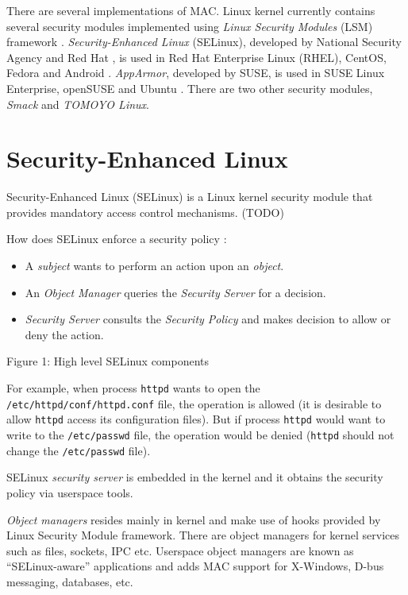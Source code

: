 There are several implementations of MAC. Linux kernel currently contains
several security modules implemented using \emph{Linux Security Modules} (LSM)
framework \cite{lsmusage}. \emph{Security-Enhanced Linux} (SELinux), developed
by National Security Agency and Red Hat \cite{selinuxcontr}, is used in Red Hat
Enterprise Linux (RHEL), CentOS, Fedora and Android
\cite{selinuxguide,selinuxguidefedora,selinuxandroid}. \emph{AppArmor},
developed by SUSE, is used in SUSE Linux Enterprise, openSUSE and Ubuntu
\cite{apparmor,apparmorubuntu}. There are two other security modules,
\emph{Smack} and \emph{TOMOYO Linux}.

\section{Security-Enhanced Linux}
Security-Enhanced Linux (SELinux) is a Linux kernel security module that
provides mandatory access control mechanisms. (TODO)

How does SELinux enforce a security policy \cite[p.~19]{tsn}:
\begin{itemize}
    \item A \emph{subject} wants to perform an action upon an \emph{object}.
    \item An \emph{Object Manager} queries the \emph{Security Server} for a
    decision.
    \item \emph{Security Server} consults the \emph{Security Policy}
    and makes decision to allow or deny the action.
\end{itemize}

Figure 1: High level SELinux components

For example, when process \texttt{httpd} wants to open the
\texttt{/etc/httpd/conf/httpd.conf} file, the operation is allowed (it is
desirable to allow \texttt{httpd} access its configuration files). But if
process \texttt{httpd} would want to write to the \texttt{/etc/passwd} file, the
operation would be denied (\texttt{httpd} should not change the
\texttt{/etc/passwd} file).

SELinux \emph{security server} is embedded in the kernel and it obtains the
security policy via userspace tools.

\emph{Object managers} resides mainly in kernel and make use of hooks provided
by Linux Security Module framework. There are object managers for kernel
services such as files, sockets, IPC etc. Userspace object managers are known as
``SELinux-aware'' applications and adds MAC support for X-Windows, D-bus
messaging, databases, etc.

